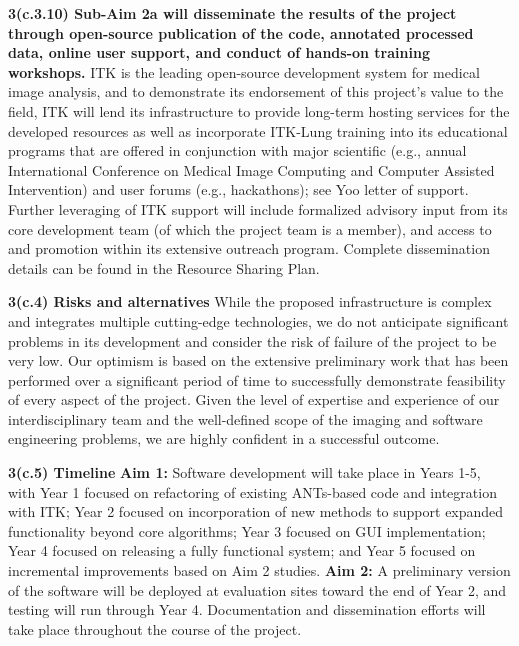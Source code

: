 \documentclass[11pt,]{article}
\begin{document}
\textbf{3(c.3.10) Sub-Aim 2a will disseminate the results of the project
through open-source publication of the code, annotated processed data,
online user support, and conduct of hands-on training workshops.} ITK is
the leading open-source development system for medical image analysis,
and to demonstrate its endorsement of this project's value to the field,
ITK will lend its infrastructure to provide long-term hosting services
for the developed resources as well as incorporate ITK-Lung training
into its educational programs that are offered in conjunction with major
scientific (e.g., annual International Conference on Medical Image
Computing and Computer Assisted Intervention) and user forums (e.g.,
hackathons); see Yoo letter of support. Further leveraging of ITK
support will include formalized advisory input from its core development
team (of which the project team is a member), and access to and
promotion within its extensive outreach program. Complete dissemination
details can be found in the Resource Sharing Plan.

\textbf{3(c.4) Risks and alternatives} While the proposed infrastructure
is complex and integrates multiple cutting-edge technologies, we do not
anticipate significant problems in its development and consider the risk
of failure of the project to be very low. Our optimism is based on the
extensive preliminary work that has been performed over a significant
period of time to successfully demonstrate feasibility of every aspect
of the project. Given the level of expertise and experience of our
interdisciplinary team and the well-defined scope of the imaging and
software engineering problems, we are highly confident in a successful
outcome.

\textbf{3(c.5) Timeline} \textbf{Aim 1:} Software development will take
place in Years 1-5, with Year 1 focused on refactoring of existing
ANTs-based code and integration with ITK; Year 2 focused on
incorporation of new methods to support expanded functionality beyond
core algorithms; Year 3 focused on GUI implementation; Year 4 focused on
releasing a fully functional system; and Year 5 focused on incremental
improvements based on Aim 2 studies. \textbf{Aim 2:} A preliminary
version of the software will be deployed at evaluation sites toward the
end of Year 2, and testing will run through Year 4. Documentation and
dissemination efforts will take place throughout the course of the
project.

\clearpage

\newpage
\end{document}
